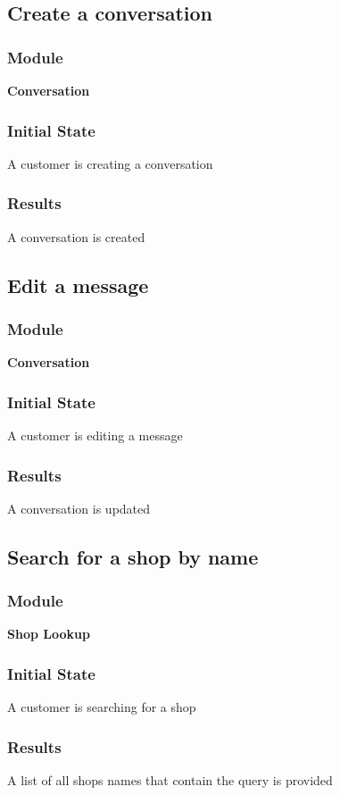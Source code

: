 \documentclass[12pt, titlepage]{article}
\begin{document}
\subsection{Create a conversation}
    \subsubsection{Module}
    \textbf{Conversation}
    \subsubsection{Initial State}
    A customer is creating a conversation
    \subsubsection{Results}
    A conversation is created

\subsection{Edit a message}
    \subsubsection{Module}
    \textbf{Conversation}
    \subsubsection{Initial State}
    A customer is editing a message
    \subsubsection{Results}
    A conversation is updated

\subsection{Search for a shop by name}
    \subsubsection{Module}
    \textbf{Shop Lookup}
    \subsubsection{Initial State}
    A customer is searching for a shop 
    \subsubsection{Results}
    A list of all shops names that contain the query is provided
\end{document}
